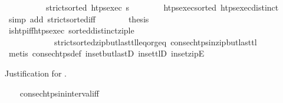 \begin{isabellebody}
%
\isadelimproof
\ \ %
\endisadelimproof
%
\isatagproof
{}\isamarkupfalse%
\ {\isacharminus}{\kern0pt}\isanewline
\ \ \ \ \isamarkupfalse%
\ {\isachardoublequoteopen}strict{\isacharunderscore}{\kern0pt}sorted\ {\isacharparenleft}{\kern0pt}htps{\isacharunderscore}{\kern0pt}exec\ {\isasympi}s{\isacharparenright}{\kern0pt}{\isachardoublequoteclose}\isanewline
\ \ \ \ \ \ \isamarkupfalse%
\ htps{\isacharunderscore}{\kern0pt}exec{\isacharunderscore}{\kern0pt}sorted\ htps{\isacharunderscore}{\kern0pt}exec{\isacharunderscore}{\kern0pt}distinct\ \isamarkupfalse%
\ {\isacharparenleft}{\kern0pt}simp\ add{\isacharcolon}{\kern0pt}\ strict{\isacharunderscore}{\kern0pt}sorted{\isacharunderscore}{\kern0pt}iff{\isacharparenright}{\kern0pt}\isanewline
\ \ \ \ \isamarkupfalse%
\ \isamarkupfalse%
\ {\isacharquery}{\kern0pt}thesis\isanewline
\ \ \ \ \ \ \isamarkupfalse%
\ is{\isacharunderscore}{\kern0pt}htp{\isacharunderscore}{\kern0pt}iff{\isacharunderscore}{\kern0pt}htps{\isacharunderscore}{\kern0pt}exec\ sorted{\isacharunderscore}{\kern0pt}distinct{\isacharunderscore}{\kern0pt}zip{\isacharunderscore}{\kern0pt}le\isanewline
\ \ \ \ \ \ \ \ \ \ \ \ strict{\isacharunderscore}{\kern0pt}sorted{\isacharunderscore}{\kern0pt}zip{\isacharunderscore}{\kern0pt}butlast{\isacharunderscore}{\kern0pt}tl{\isacharunderscore}{\kern0pt}leq{\isacharunderscore}{\kern0pt}or{\isacharunderscore}{\kern0pt}geq\ consec{\isacharunderscore}{\kern0pt}htps{\isacharunderscore}{\kern0pt}in{\isacharunderscore}{\kern0pt}zip{\isacharunderscore}{\kern0pt}butlast{\isacharunderscore}{\kern0pt}tl\isanewline
\ \ \ \ \ \ \isamarkupfalse%
\ {\isacharparenleft}{\kern0pt}metis\ consec{\isacharunderscore}{\kern0pt}htps{\isacharunderscore}{\kern0pt}def\ in{\isacharunderscore}{\kern0pt}set{\isacharunderscore}{\kern0pt}butlastD\ in{\isacharunderscore}{\kern0pt}set{\isacharunderscore}{\kern0pt}tlD\ in{\isacharunderscore}{\kern0pt}set{\isacharunderscore}{\kern0pt}zipE{\isacharparenright}{\kern0pt}\isanewline
\ \ \isamarkupfalse%
%
\endisatagproof
{\isafoldproof}%
%
\isadelimproof
%
\endisadelimproof
%
\begin{isamarkuptext}%
Justification for .%
\end{isamarkuptext}\isamarkuptrue%
\ \ \isamarkupfalse%
\ consec{\isacharunderscore}{\kern0pt}htps{\isacharunderscore}{\kern0pt}in{\isacharunderscore}{\kern0pt}interval{\isacharunderscore}{\kern0pt}iff{\isacharcolon}{\kern0pt}\isanewline

\end{isabellebody}
